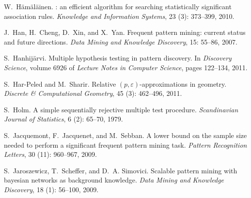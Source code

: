 \begin{thebibliography}{42}
W.~H{\"a}m{\"a}l{\"a}inen.
: an efficient algorithm for searching statistically
  significant association rules.
\newblock \emph{Knowledge and Information Systems}, 23 (3):
  373--399, 2010.

J.~Han, H.~Cheng, D.~Xin, and X.~Yan.
\newblock Frequent pattern mining: current status and future directions.
\newblock \emph{Data Mining and Knowledge Discovery}, 15: 55--86,
  2007.

S.~Hanhij{\"a}rvi.
\newblock Multiple hypothesis testing in pattern discovery.
\newblock In \emph{Discovery Science}, volume 6926 of \emph{Lecture Notes in
  Computer Science}, pages 122--134, 2011.

S.~Har-Peled and M.~Sharir.
\newblock Relative $(p,\varepsilon)$-approximations in geometry.
\newblock \emph{Discrete \& Computational Geometry}, 45 (3):
  462--496, 2011.

S.~Holm.
\newblock A simple sequentially rejective multiple test procedure.
\newblock \emph{Scandinavian Journal of Statistics}, 6 (2):
  65--70, 1979.

S.~Jacquemont, F.~Jacquenet, and M.~Sebban.
\newblock A lower bound on the sample size needed to perform a significant
  frequent pattern mining task.
\newblock \emph{Pattern Recognition Letters}, 30 (11):
  960--967, 2009.

S.~Jaroszewicz, T.~Scheffer, and D.~A. Simovici.
\newblock Scalable pattern mining with bayesian networks as background
  knowledge.
\newblock \emph{Data Mining and Knowledge Discovery}, 18 (1):
  56--100, 2009.


\end{thebibliography}
